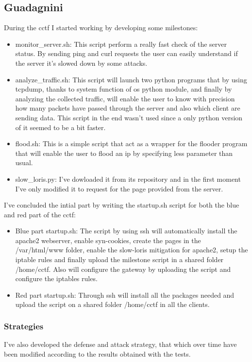 \documentclass[14pt]{article}
\begin{document}
\subsection{Guadagnini}
During the cctf I started working by developing some milestones: 
\begin{itemize}
	\item monitor\_server.sh: This script perform a really fast check of the server status. By sending ping and curl requests the user can easily understand if the server it's slowed down by some attacks.
	
	\item analyze\_traffic.sh: This script will launch two python programs that by using tcpdump, thanks to system function of os python module, and finally by analyzing the collected traffic, will enable the user to know with precision how many packets have passed through the server and also which client are sending data. This script in the end wasn't used since a only python version of it seemed to be a bit faster.
	
	\item flood.sh: This is a simple script that act as a wrapper for the flooder program that will enable the user to flood an ip by specifying less parameter than usual.
	
	\item slow\_loris.py: I've dowloaded it from its repository and in the first moment I've only modified it to request for the page provided from the server.
\end{itemize}

I've concluded the intial part by writing the startup.sh script for both the blue and red part of the cctf:
\begin{itemize}
	\item Blue part startup.sh: The script by using ssh will automatically install the apache2 webserver, enable syn-cookies, create the pages in the /var/html/www folder, enable the slow-loris mitigation for apache2, setup the iptable rules and finally upload the milestone script in a shared folder /home/cctf. Also will configure the gateway by uploading the script and configure the iptables rules.
	
	\item Red part startup.sh: Through ssh will install all the packages needed and upload the script on a shared folder /home/cctf in all the clients.
\end{itemize}

\subsubsection{Strategies}
I've also developed the defense and attack strategy, that which over time have been modified according to the results obtained with the tests.
\end{document}
